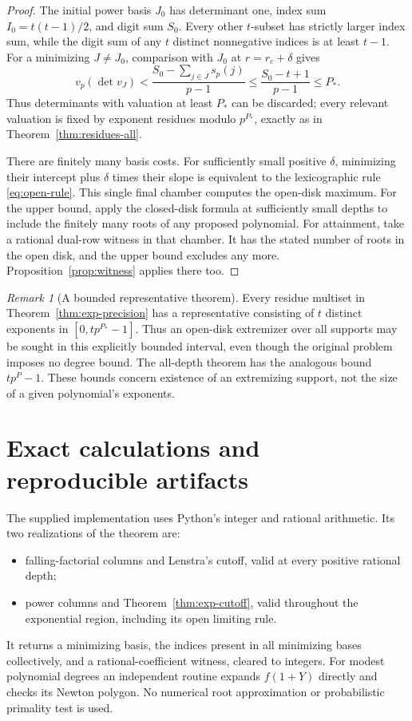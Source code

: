 \documentclass[11pt,letterpaper]{article}
\theoremstyle{definition}\newtheorem{definition}[theorem]{Definition}
\theoremstyle{remark}\newtheorem{remark}[theorem]{Remark}
\newcommand{\vp}{v_p}
\newcommand{\ds}{s_p}
\begin{document}
\begin{proof}
The initial power basis $J_0$ has determinant one, index sum
$I_0=t(t-1)/2$, and digit sum $S_0$. Every other $t$-subset has strictly
larger index sum, while the digit sum of any $t$ distinct nonnegative
indices is at least $t-1$. For a minimizing $J\ne J_0$, comparison
with $J_0$ at $r=r_c+\delta$ gives
\[
 \vp(\det v_J)
 <\frac{S_0-\sum_{j\in J}\ds(j)}{p-1}
 \le\frac{S_0-t+1}{p-1}\le P_*.
\]
Thus determinants with valuation at least $P_*$ can be discarded;
every relevant valuation is fixed by exponent residues modulo
$p^{P_*}$, exactly as in Theorem~\ref{thm:residues-all}.

There are finitely many basis costs. For sufficiently small positive
$\delta$, minimizing their intercept plus $\delta$ times their slope
is equivalent to the lexicographic rule \eqref{eq:open-rule}. This
single final chamber computes the open-disk maximum. For the upper
bound, apply the closed-disk formula at sufficiently small depths to
include the finitely many roots of any proposed polynomial. For
attainment, take a rational dual-row witness in that chamber. It has
the stated number of roots in the open disk, and the upper bound
excludes any more. Proposition~\ref{prop:witness} applies there too.
\end{proof}

\begin{remark}[A bounded representative theorem]
Every residue multiset in Theorem~\ref{thm:exp-precision} has a
representative consisting of $t$ distinct exponents in
$[0,tp^{P_*}-1]$. Thus an open-disk extremizer over all supports
may be sought in this explicitly bounded interval, even though the
original problem imposes no degree bound. The all-depth theorem has
the analogous bound $tp^P-1$. These bounds concern existence of an
extremizing support, not the size of a given polynomial's exponents.
\end{remark}




\section{Exact calculations and reproducible artifacts}
The supplied implementation uses Python's integer and rational
arithmetic. Its two realizations of the theorem are:
\begin{itemize}
\item falling-factorial columns and Lenstra's cutoff, valid at every
positive rational depth;
\item power columns and Theorem~\ref{thm:exp-cutoff}, valid throughout
the exponential region, including its open limiting rule.
\end{itemize}
It returns a minimizing basis, the indices present in all minimizing
bases collectively, and a rational-coefficient witness, cleared to
integers. For modest polynomial degrees an independent routine expands
$f(1+Y)$ directly and checks its Newton polygon. No numerical root
approximation or probabilistic primality test is used.
\end{document}
